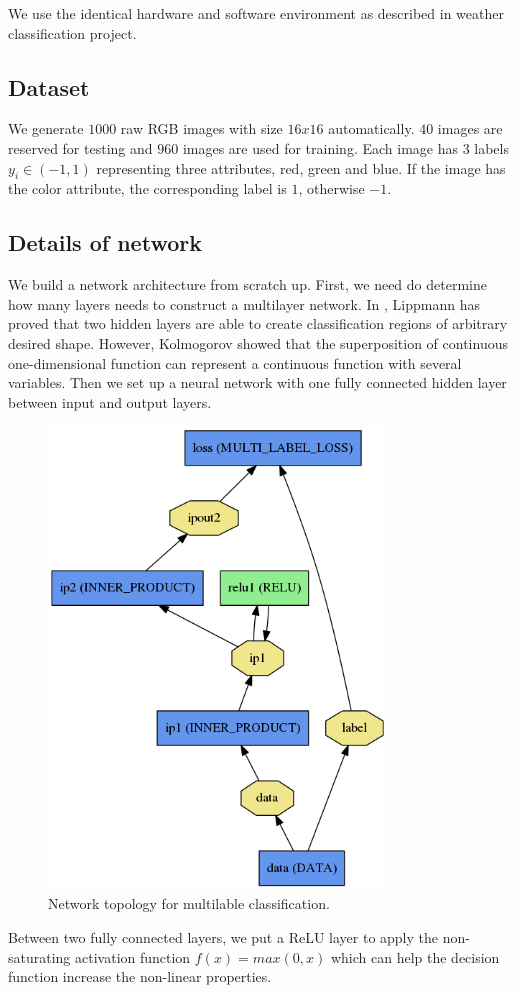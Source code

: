 We use the identical hardware and software environment as described in weather classification project.

\subsection{Dataset}

We generate $1000$ raw RGB images with size $16x16$ automatically. $40$ images are reserved for testing and $960$ images are used for training. Each image has $3$ labels $y_i \in (-1, 1)$ representing three attributes, red, green and blue. If the image has the color attribute, the corresponding label is $1$, otherwise $-1$.

\subsection{Details of network}

We build a network architecture from scratch up. First, we need do determine how many layers needs to construct a multilayer network. In \cite{lippmann1987introduction}, Lippmann has proved that two hidden layers are able to create classification regions of arbitrary desired shape. However, Kolmogorov \citep{kolmogorov1963representation} showed that the superposition of continuous one-dimensional function can represent a continuous function with several variables. Then we set up a neural network with one fully connected hidden layer between input and output layers.
\begin{figure}[!htb]
\centering
\includegraphics[width=0.8\textwidth]{multilabel-topology.png}
\caption{\label{fig:perceptron}Network topology for multilable classification.}
\end{figure}
Between two fully connected layers, we put a ReLU layer to apply the non-saturating activation function $f(x) = max(0,x)$ which can help the decision function increase the non-linear properties.

